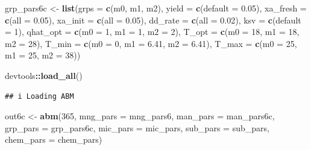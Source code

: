 \documentclass[
]{article}
\newenvironment{Shaded}{\begin{snugshade}}{\end{snugshade}}
\newcommand{\AttributeTok}[1]{\textcolor[rgb]{0.13,0.29,0.53}{#1}}
\newcommand{\DecValTok}[1]{\textcolor[rgb]{0.00,0.00,0.81}{#1}}
\newcommand{\FloatTok}[1]{\textcolor[rgb]{0.00,0.00,0.81}{#1}}
\newcommand{\FunctionTok}[1]{\textcolor[rgb]{0.13,0.29,0.53}{\textbf{#1}}}
\newcommand{\NormalTok}[1]{#1}
\newcommand{\OtherTok}[1]{\textcolor[rgb]{0.56,0.35,0.01}{#1}}
\newcommand{\SpecialCharTok}[1]{\textcolor[rgb]{0.81,0.36,0.00}{\textbf{#1}}}
\newcommand{\StringTok}[1]{\textcolor[rgb]{0.31,0.60,0.02}{#1}}
\begin{document}
\begin{Shaded}
\begin{Highlighting}[]
\NormalTok{grp\_pars6c }\OtherTok{\textless{}{-}} \FunctionTok{list}\NormalTok{(}\AttributeTok{grps =} \FunctionTok{c}\NormalTok{(}\StringTok{\textquotesingle{}m0\textquotesingle{}}\NormalTok{, }\StringTok{\textquotesingle{}m1\textquotesingle{}}\NormalTok{, }\StringTok{\textquotesingle{}m2\textquotesingle{}}\NormalTok{),}
                 \AttributeTok{yield =} \FunctionTok{c}\NormalTok{(}\AttributeTok{default =} \FloatTok{0.05}\NormalTok{),}
                 \AttributeTok{xa\_fresh =} \FunctionTok{c}\NormalTok{(}\AttributeTok{all =} \FloatTok{0.05}\NormalTok{),}
                 \AttributeTok{xa\_init =} \FunctionTok{c}\NormalTok{(}\AttributeTok{all =} \FloatTok{0.05}\NormalTok{),}
                 \AttributeTok{dd\_rate =} \FunctionTok{c}\NormalTok{(}\AttributeTok{all =} \FloatTok{0.02}\NormalTok{),}
                 \AttributeTok{ksv =} \FunctionTok{c}\NormalTok{(}\AttributeTok{default =} \DecValTok{1}\NormalTok{),}
                 \AttributeTok{qhat\_opt =} \FunctionTok{c}\NormalTok{(}\AttributeTok{m0 =} \DecValTok{1}\NormalTok{, }\AttributeTok{m1 =} \DecValTok{1}\NormalTok{, }\AttributeTok{m2 =} \DecValTok{2}\NormalTok{),}
                 \AttributeTok{T\_opt =} \FunctionTok{c}\NormalTok{(}\AttributeTok{m0 =} \DecValTok{18}\NormalTok{, }\AttributeTok{m1 =} \DecValTok{18}\NormalTok{, }\AttributeTok{m2 =} \DecValTok{28}\NormalTok{),}
                 \AttributeTok{T\_min =} \FunctionTok{c}\NormalTok{(}\AttributeTok{m0 =} \DecValTok{0}\NormalTok{, }\AttributeTok{m1 =} \FloatTok{6.41}\NormalTok{, }\AttributeTok{m2 =} \FloatTok{6.41}\NormalTok{),}
                 \AttributeTok{T\_max =} \FunctionTok{c}\NormalTok{(}\AttributeTok{m0 =} \DecValTok{25}\NormalTok{, }\AttributeTok{m1 =} \DecValTok{25}\NormalTok{, }\AttributeTok{m2 =} \DecValTok{38}\NormalTok{))}
\end{Highlighting}
\end{Shaded}

\begin{Shaded}
\begin{Highlighting}[]
\NormalTok{devtools}\SpecialCharTok{::}\FunctionTok{load\_all}\NormalTok{()}
\end{Highlighting}
\end{Shaded}

\begin{verbatim}
## i Loading ABM
\end{verbatim}

\begin{Shaded}
\begin{Highlighting}[]
\NormalTok{out6c }\OtherTok{\textless{}{-}} \FunctionTok{abm}\NormalTok{(}\DecValTok{365}\NormalTok{,}
            \AttributeTok{mng\_pars =}\NormalTok{ mng\_pars6,}
            \AttributeTok{man\_pars =}\NormalTok{ man\_pars6c,}
            \AttributeTok{grp\_pars =}\NormalTok{ grp\_pars6c,}
            \AttributeTok{mic\_pars =}\NormalTok{ mic\_pars,}
            \AttributeTok{sub\_pars =}\NormalTok{ sub\_pars,}
            \AttributeTok{chem\_pars =}\NormalTok{ chem\_pars)}
\end{Highlighting}
\end{Shaded}
\end{document}

